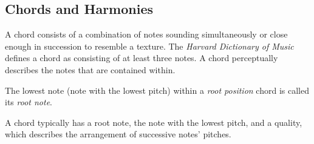 \subsection{Chords and Harmonies}

A chord consists of a combination of notes sounding simultaneously or close enough in succession to resemble a texture. The \textit{Harvard Dictionary of Music} defines a chord as consisting of at least three notes. A chord perceptually describes the notes that are contained within.

The lowest note (note with the lowest pitch) within a \textit{root position} chord is called its \textit{root note}.

A chord typically has a root note, the note with the lowest pitch, and a quality, which describes the arrangement of successive notes' pitches.